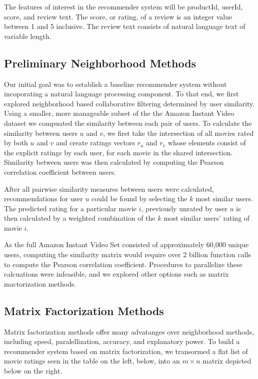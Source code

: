 \documentclass{article} %
\begin{document}
The features of interest in the recommender system will be productId, userId, score, and review text.  The score, or rating, of a review is an integer value between 1 and 5 inclusive. The review text consists of natural language text of variable length.

\subsection{Preliminary Neighborhood Methods}
Our initial goal was to establish a baseline recommender system without incoporating a natural language processing component. To that end, we first explored neighborhood based collaborative filtering determined by user similarity. Using a smaller, more manageable subset of the the Amazon Instant Video dataset we compuated the similarity between each pair of users. To calculate the similarity between users $u$ and $v$, we first take the intersection of all movies rated by both $u$ and $v$ and create ratings vectors $r_u$ and $r_v$ whose elements consist of the explicit ratings by each user, for each movie in the shared intersection. Similarity between users was then calculated by computing the Pearson correlation coefficient between users. 

After all pairwise similarity measures between users were calculated, recommendations for user $u$ could be found by selecting the $k$ most similar users. The predicted rating for a particular movie $i$, previously unrated by user $u$ is then calculated by a weighted combination of the $k$ most similar users' rating of movie $i$.

As the full Amazon Instant Video Set consisted of approximately 60,000 unique users, computing the similarity matrix would require over 2 billion function calls to compute the Pearson correlation coefficient. Procedures to parallelize these calcuations were infeasible, and we explored other options such as matrix mactorization methods. 

\subsection{Matrix Factorization Methods}
Matrix factorization methods offer many advatanges over neighborhood methods, including speed, paralellization, accuracy, and explanatory power. To build a recommender system based on matrix factorization, we transormed a flat list of movie ratings seen in the table on the left, below, into an $m \times n$ matrix depicted below on the right.
\end{document}
